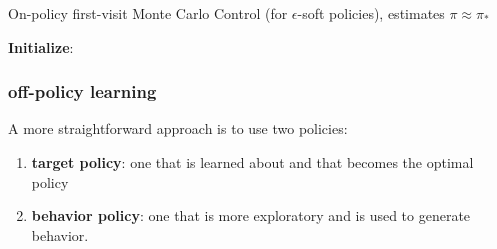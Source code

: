 \begin{algorithm}[h!]
    \caption{On-policy first-visit Monte Carlo Control (for $\epsilon$-soft policies), estimates $\pi \approx \pi_*$}

    \textbf{Initialize}: \\

\end{algorithm}


\subsubsection{off-policy learning \cite{medium/nerd-for-tech/monte-carlo-methods-for-reinforcement-learning-d30d874dd817}}\label{RL: off-policy learning}

A more straightforward approach is to use two policies:
\begin{enumerate}
    \item \textbf{target policy}: one that is learned about and that becomes the optimal policy
    \item \textbf{behavior policy}: one that is more exploratory and is used to generate behavior. 
\end{enumerate}

